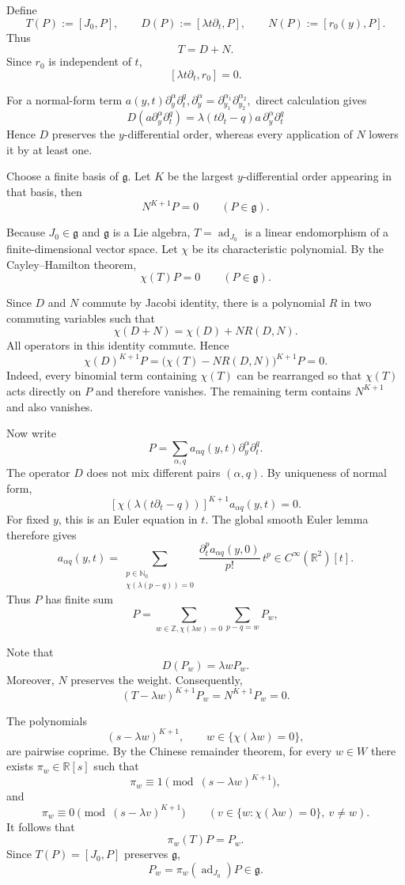 \documentclass[11pt,a4paper]{article}
\numberwithin{equation}{section}
\theoremstyle{journalplain}
\theoremstyle{journaldef}
\begin{document}
\begin{tcolorbox}[
  title={Proof of Lemma~\ref{lem:smooth-euler-module}},
  breakable
]
Define
\[
T(P):=[J_0,P],
\qquad
D(P):=[\lambda t\partial_t,P],
\qquad
N(P):=[r_0(y),P].
\]
Thus
\[
T=D+N.
\]
Since $r_0$ is independent of $t$,
\[
[\lambda t\partial_t,r_0]=0.
\]

For a normal-form term
\(
a(y,t)\partial_y^\alpha\partial_t^q,
\partial_y^\alpha
=
\partial_{y_1}^{\alpha_1}\partial_{y_2}^{\alpha_2},
\)
direct calculation gives
\[
D\left(a\partial_y^\alpha\partial_t^q\right)
=
\lambda(t\partial_t-q)a\,
\partial_y^\alpha\partial_t^q
\]
Hence $D$ preserves the $y$-differential order, whereas every
application of $N$ lowers it by at least one.

Choose a finite basis of $\mathfrak g$. Let $K$ be the largest
$y$-differential order appearing in that basis, then
\[
N^{K+1}P=0
\qquad(P\in\mathfrak g).
\]

Because $J_0\in\mathfrak g$ and $\mathfrak g$ is a Lie algebra, $T = \operatorname{ad}_{J_0}$
is a linear endomorphism of a finite-dimensional vector space.
Let $\chi$ be its characteristic polynomial. By the
Cayley--Hamilton theorem,
\[
\chi(T)P=0
\qquad(P\in\mathfrak g).
\]

Since $D$ and $N$ commute by Jacobi identity, there is a polynomial $R$ in two
commuting variables such that
\[
\chi(D+N)=\chi(D)+NR(D,N).
\]
All operators in this identity commute. Hence
\[
\chi(D)^{K+1}P
=
\bigl(\chi(T)-NR(D,N)\bigr)^{K+1}P= 0.
\]
Indeed, every binomial term containing $\chi(T)$ can be rearranged
so that $\chi(T)$ acts directly on $P$ and therefore vanishes.
The remaining term contains $N^{K+1}$ and also vanishes.

Now write
\[
P=\sum_{\alpha,q}
a_{\alpha q}(y,t)\partial_y^\alpha\partial_t^q.
\]
The operator $D$ does not mix different pairs $(\alpha,q)$.
By uniqueness of normal form,
\[
\left[
\chi\!\left(\lambda(t\partial_t-q)\right)
\right]^{K+1}
a_{\alpha q}(y,t)=0.
\]
For fixed $y$, this is an Euler equation in $t$. The global smooth
Euler lemma therefore gives
\[
a_{\alpha q}(y,t)
=
\sum_{\substack{p\in\mathbb N_0\\
\chi(\lambda(p-q))=0}}
\frac{\partial_t^pa_{\alpha q}(y,0)}{p!}\,t^p \in C^\infty (\mathbb R^2)[t].
\]
Thus $P$ has finite sum
\[P = \sum_{w \in \mathbb Z,\chi(\lambda w) = 0}\sum_{p - q = w} P_w,\]

Note that
\[
D(P_w)=\lambda wP_w.
\]
Moreover, $N$ preserves the weight. Consequently,
\[
(T-\lambda w)^{K+1}P_w=N^{K+1}P_w=0.
\]

The polynomials
\[
(s-\lambda w)^{K+1},
\qquad w\in \{\chi(\lambda w) = 0\},
\]
are pairwise coprime. By the Chinese remainder theorem, for every
$w\in W$ there exists $\pi_w\in\mathbb R[s]$ such that
\[
\pi_w\equiv1\pmod{(s-\lambda w)^{K+1}},
\]
and
\[
\pi_w\equiv0\pmod{(s-\lambda v)^{K+1}}
\qquad(v\in \{w:\chi(\lambda w) = 0\},\ v\ne w).
\]
It follows that
\[
\pi_w(T)P=P_w.
\]
Since $T(P)=[J_0,P]$ preserves $\mathfrak g$,
\[
P_w
=
\pi_w(\operatorname{ad}_{J_0})P
\in\mathfrak g.
\]
\end{tcolorbox}
\end{document}
